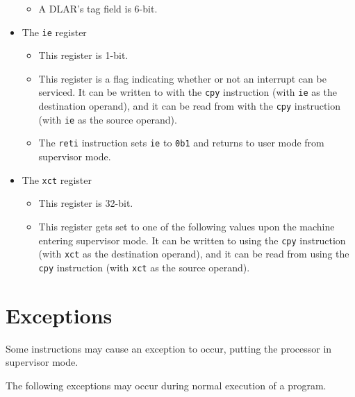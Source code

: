 \documentclass{article}
\begin{document}
\begin{itemize}
\begin{itemize}
		\item A DLAR's tag field is 6-bit.
		\end{itemize}

	\item The \texttt{ie} register
		\begin{itemize}
		\item This register is 1-bit.

		\item This register is a flag indicating whether or not an
		interrupt can be serviced.  It can be written to with the
		\texttt{cpy} instruction (with \texttt{ie} as the destination
		operand), and it can be read from with the \texttt{cpy} instruction
		(with \texttt{ie} as the source operand).

		\item The \texttt{reti} instruction sets \texttt{ie} to
		\texttt{0b1} and returns to user mode from supervisor mode.
		\end{itemize}

	\item The \texttt{xct} register
		\begin{itemize}
		\item This register is 32-bit.

		\item This register gets set to one of the following values upon
		the machine entering supervisor mode.  It can be written to using
		the \texttt{cpy} instruction (with \texttt{xct} as the destination
		operand), and it can be read from using the \texttt{cpy}
		instruction (with \texttt{xct} as the source operand).
		\end{itemize}
	\end{itemize}
	\newpage

\section{Exceptions}
	Some instructions may cause an exception to occur, putting the
	processor in supervisor mode.

	The following exceptions may occur during normal execution of a
	program.
\end{document}

